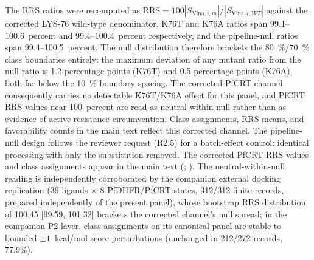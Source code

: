 \documentclass[journal=jcisd8,manuscript=suppinfo]{achemso}
\begin{document}
The RRS ratios were recomputed as $\mathrm{RRS}=100|S_{\mathrm{Vina},i,m}|/|S_{\mathrm{Vina},i,WT}|$ against the corrected LYS-76 wild-type denominator. K76T and K76A ratios span \numrange{99.1}{100.6}~percent and \numrange{99.4}{100.4}~percent respectively, and the pipeline-null ratios span \numrange{99.4}{100.5}~percent. The null distribution therefore brackets the \qty{80}{\percent}/\qty{70}{\percent} class boundaries entirely: the maximum deviation of any mutant ratio from the null ratio is \num{1.2} percentage points (K76T) and \num{0.5} percentage points (K76A), both far below the \qty{10}{\percent} boundary spacing. The corrected PfCRT channel consequently carries no detectable K76T/K76A effect for this panel, and PfCRT RRS values near \num{100}~percent are read as neutral-within-null rather than as evidence of active resistance circumvention. Class assignments, RRS means, and favorability counts in the main text reflect this corrected channel. The pipeline-null design follows the reviewer request (R2.5) for a batch-effect control: identical processing with only the substitution removed. The corrected PfCRT RRS values and class assignments appear in the main text (; ). The neutral-within-null reading is independently corroborated by the companion external docking replication (39 ligands $\times$ 8 PfDHFR/PfCRT states, 312/312 finite records, prepared independently of the present panel), whose bootstrap RRS distribution of 100.45 [99.59, 101.32] brackets the corrected channel's null spread; in the companion P2 layer, class assignments on its canonical panel are stable to bounded $\pm1$~kcal/mol score perturbations (unchanged in 212/272 records, 77.9\%).
\end{document}
